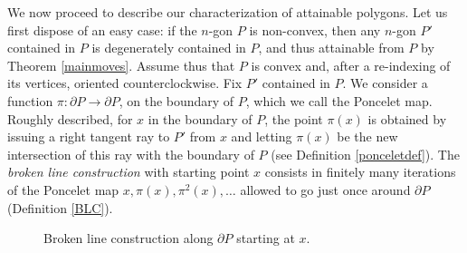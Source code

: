 \documentclass[11pt]{amsart}
\theoremstyle{remark}
\numberwithin{equation}{section}
\begin{document}
We  now proceed to describe our characterization of attainable polygons. Let us first dispose of an easy case: if the $n$-gon $P$ is non-convex, then any $n$-gon $P'$  contained in $P$ is degenerately contained in $P$, and thus attainable from $P$ by Theorem \ref{mainmoves}. Assume thus that $P$ is convex and, after a re-indexing of its vertices, oriented counterclockwise. Fix $P'$ contained in $P$.  We consider a function $\pi\colon \partial P\to \partial P$, on the boundary of $P$, which we call the Poncelet map. Roughly described, for $x$ in the boundary of $P$, the point $\pi(x)$ is obtained by issuing a right tangent ray to $P'$ from $x$ and letting $\pi(x)$ be the new intersection of this ray with the boundary of $P$ (see Definition \ref{ponceletdef}). The \emph{broken line construction} with starting point $x$ consists in finitely many iterations of the Poncelet map 
 $x,\pi(x),\pi^2(x),\ldots$ allowed to go just once around $\partial P$ (Definition \ref{BLC}).


\begin{figure}[h]
\centering


\caption{Broken line construction along $\partial P$ starting at $x$.}
\label{fig_poncelet}
\end{figure}
\end{document}
